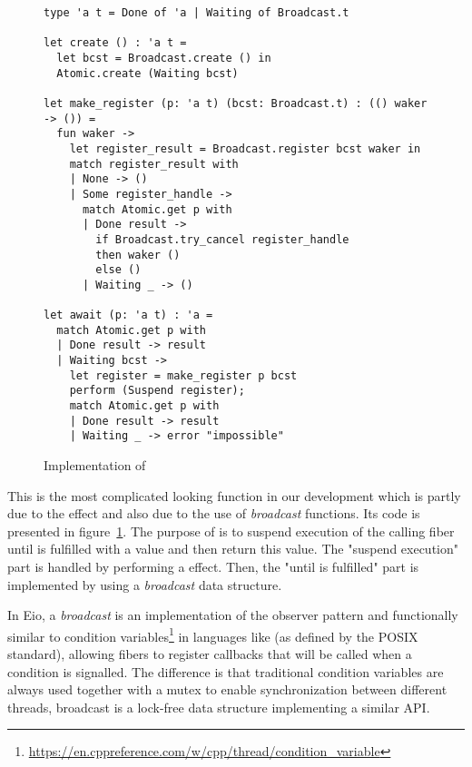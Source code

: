 \begin{figure}[ht]
  \begin{verbatim}
type 'a t = Done of 'a | Waiting of Broadcast.t

let create () : 'a t = 
  let bcst = Broadcast.create () in
  Atomic.create (Waiting bcst)

let make_register (p: 'a t) (bcst: Broadcast.t) : (() waker -> ()) = 
  fun waker ->
    let register_result = Broadcast.register bcst waker in
    match register_result with
    | None -> ()
    | Some register_handle ->
      match Atomic.get p with
      | Done result ->  
        if Broadcast.try_cancel register_handle
        then waker ()
        else ()
      | Waiting _ -> ()

let await (p: 'a t) : 'a = 
  match Atomic.get p with
  | Done result -> result
  | Waiting bcst ->
    let register = make_register p bcst
    perform (Suspend register);
    match Atomic.get p with
    | Done result -> result 
    | Waiting _ -> error "impossible"
  \end{verbatim}
  \caption{Implementation of }
  \label{fig:sched-impl-await}
\end{figure}

This is the most complicated looking function in our development which is partly due to the \esuspend{} effect and also due to the use of \emph{broadcast} functions.
Its code is presented in figure~\ref{fig:sched-impl-await}.
The purpose of  is to suspend execution of the calling fiber until  is fulfilled with a value and then return this value.
The "suspend execution" part is handled by performing a \esuspend{} effect.
Then, the "until  is fulfilled" part is implemented by using a \emph{broadcast} data structure.

In Eio, a \emph{broadcast} is an implementation of the observer pattern and functionally similar to condition variables\footnote{\url{https://en.cppreference.com/w/cpp/thread/condition_variable}} in languages like \CC{} (as defined by the POSIX standard), allowing fibers to register callbacks that will be called when a condition is signalled.
The difference is that traditional condition variables are always used together with a mutex to enable synchronization between different threads, broadcast is a lock-free data structure implementing a similar API.

